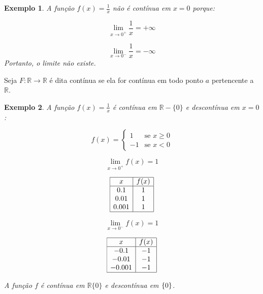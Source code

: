 \documentclass{book}
\numberwithin{defn}{chapter}
\newtheorem{exe}{Exemplo}
\numberwithin{exe}{chapter}
\numberwithin{ex}{chapter}
\numberwithin{obs}{chapter}
\numberwithin{fato}{chapter}
\numberwithin{resp}{chapter}
\begin{document}
\begin{exe} A função \( f(x) = \frac{1}{x} \) não é contínua em \( x = 0 \) porque:

\[
\lim_{x \to 0^+} \frac{1}{x} = +\infty
\]

\[
\lim_{x \to 0^-} \frac{1}{x} = -\infty
\]
Portanto, o limite não existe.
\end{exe}

\noindent Seja \( F: \mathbb{R} \rightarrow \mathbb{R} \) é dita contínua se ela for contínua em todo ponto \( a \) pertencente a \( \mathbb{R} \).

\begin{exe} A função \( f(x) = \frac{1}{x} \) é contínua em \( \mathbb{R} - \{0\} \) e descontínua em \( x = 0 \):

\[
f(x) = 
\begin{cases}
    1 & \text{se } x \geq 0 \\
    -1 & \text{se } x < 0
\end{cases}
\]

\[
\lim_{x \to 0^+} f(x) = 1
\]

\[
\begin{array}{|c|c|}
\hline
x & f(x) \\
\hline
0.1 & 1 \\
0.01 & 1 \\
0.001 & 1 \\
\hline
\end{array}
\]

\[
\lim_{x \to 0^-} f(x) = 1
\]

\[
\begin{array}{|c|c|}
\hline
x & f(x) \\
\hline
-0.1 & -1 \\
-0.01 & -1 \\
-0.001 & -1 \\
\hline
\end{array}
\]

\noindent A função \( f \) é contínua em \(\mathbb{R} \{0\}\) e descontínua em   \(\mathbb \{0\}\).
\end{exe}
\end{document}
